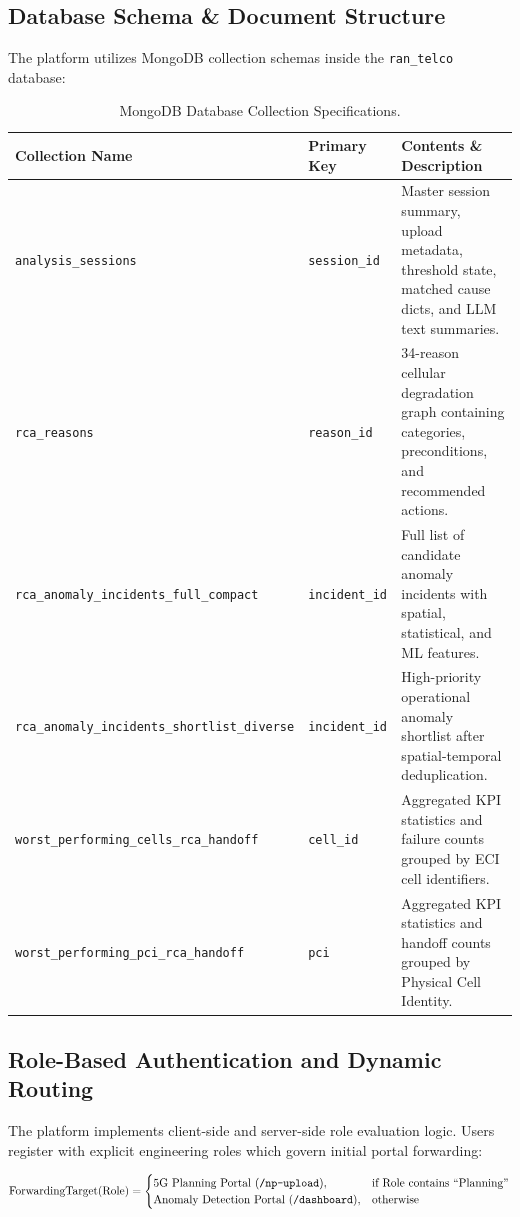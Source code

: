\documentclass[12pt,a4paper]{report}
\begin{document}
\subsection{Database Schema \& Document Structure}
The platform utilizes MongoDB collection schemas inside the \texttt{ran\_telco} database:
\begin{table}[htbp]
\centering
\caption{MongoDB Database Collection Specifications.}
\label{tab:mongo_collections}
\small
\begin{tabular}{llp{8cm}}
\toprule
\textbf{Collection Name} & \textbf{Primary Key} & \textbf{Contents \& Description} \\
\midrule
\texttt{analysis\_sessions} & \texttt{session\_id} & Master session summary, upload metadata, threshold state, matched cause dicts, and LLM text summaries. \\
\texttt{rca\_reasons} & \texttt{reason\_id} & 34-reason cellular degradation graph containing categories, preconditions, and recommended actions. \\
\texttt{rca\_anomaly\_incidents\_full\_compact} & \texttt{incident\_id} & Full list of candidate anomaly incidents with spatial, statistical, and ML features. \\
\texttt{rca\_anomaly\_incidents\_shortlist\_diverse} & \texttt{incident\_id} & High-priority operational anomaly shortlist after spatial-temporal deduplication. \\
\texttt{worst\_performing\_cells\_rca\_handoff} & \texttt{cell\_id} & Aggregated KPI statistics and failure counts grouped by ECI cell identifiers. \\
\texttt{worst\_performing\_pci\_rca\_handoff} & \texttt{pci} & Aggregated KPI statistics and handoff counts grouped by Physical Cell Identity. \\
\bottomrule
\end{tabular}
\end{table}

\subsection{Role-Based Authentication and Dynamic Routing}
The platform implements client-side and server-side role evaluation logic. Users register with explicit engineering roles which govern initial portal forwarding:

\begin{equation}
\text{ForwardingTarget}(\text{Role}) = 
\begin{cases} 
\text{5G Planning Portal (\texttt{/np-upload})}, & \text{if } \text{Role} \text{ contains ``Planning''} \\
\text{Anomaly Detection Portal (\texttt{/dashboard})}, & \text{otherwise}
\end{cases}
\end{equation}
\end{document}
